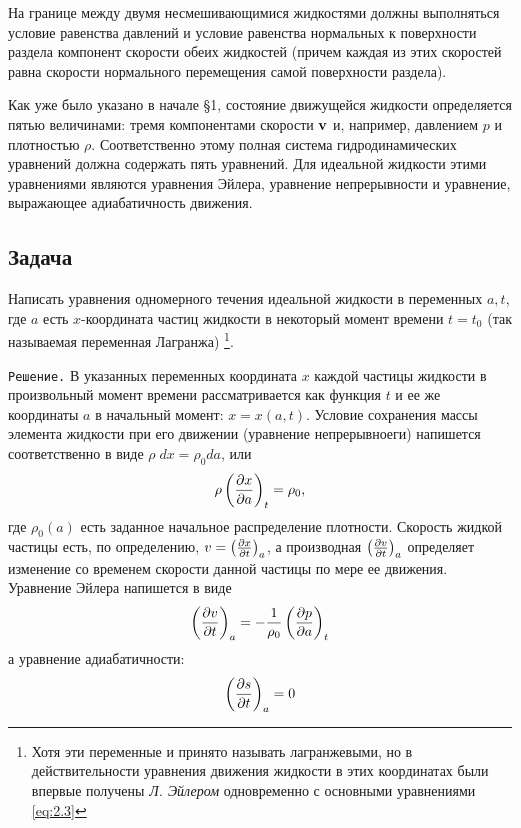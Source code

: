 На границе между двумя несмешивающимися жидкостями должны выполняться условие
равенства давлений и условие равенства нормальных к поверхности раздела
компонент скорости обеих жидкостей (причем каждая из этих скоростей равна
скорости нормального перемещения самой поверхности раздела).

Как уже было указано в начале \S1, состояние движущейся жидкости определяется
пятью величинами: тремя компонентами скорости ${\mathbf{v}}$ и, например, давлением $p$ и
плотностью $\rho$. Соответственно этому полная система гидродинамических
уравнений должна содержать пять уравнений. Для идеальной жидкости этими
уравнениями являются уравнения Эйлера, уравнение непрерывности и уравнение,
выражающее адиабатичность движения.

\subsection*{Задача}
Написать уравнения одномерного течения идеальной жидкости в переменных $a,t$,
где $a$ есть $x$-координата частиц жидкости в некоторый момент времени $t=t_0$
(так называемая переменная Лагранжа) \footnote{Хотя эти переменные и принято называть
лагранжевыми, но в действительности уравнения движения жидкости в этих координатах
были впервые получены \textit{Л. Эйлером} одновременно с основными уравнениями \ref{eq:2.3}}.

\texttt{Решение.} В указанных переменных координата $x$ каждой частицы жидкости
в произвольный момент времени рассматривается как функция $t$ и ее же координаты
$a$ в начальный момент: $x = x(a,t)$. Условие сохранения массы элемента жидкости
при его движении (уравнение непрерывноеги) напишется соответственно в виде
$\rho\;dx = \rho_0 da$, или
\[
   \rho \left( \frac{\partial{x}}{\partial{a}} \right)_{t}= \rho_0,
\]
где $\rho_0(a)$ есть заданное начальное распределение плотности. Скорость жидкой
частицы есть, по определению, $v = \left( \frac{\partial{x}}{\partial{t}} \right)_{a}$, а производная $\left( \frac{\partial{v}}{\partial{t}} \right)_{a}$
определяет изменение со временем скорости данной частицы по мере ее движения.
Уравнение Эйлера напишется в виде
\[
   \left( \frac{\partial{v}}{\partial{t}} \right)_{a} = - \frac1{\rho_0} \left( \frac{\partial{p}}{\partial{a}} \right)_{t}
\]
а уравнение адиабатичности:
\[
   \left( \frac{\partial{s}}{\partial{t}} \right)_{a} = 0
\]
